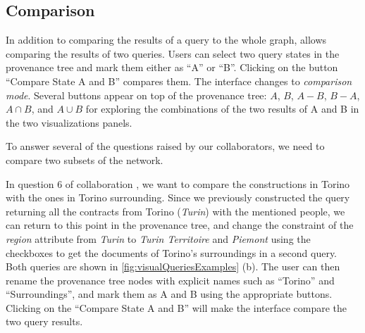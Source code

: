 \subsection{Comparison}

In addition to comparing the results of a query to the whole graph, \name allows comparing the results of two queries.
Users can select two query states in the provenance tree and mark them either as ``A'' or ``B''.
Clicking on the button ``Compare State A and B'' compares them.
The interface changes to \emph{comparison mode}.
Several buttons appear on top of the provenance tree: $A$, $B$, $A-B$, $B-A$, $A \cap B$, and $A \cup B$ for exploring the combinations of the two results of A and B in the two visualizations panels.

To answer several of the questions raised by our collaborators, we need to compare two subsets of the network.

In question 6 of collaboration \pascal, we want to compare the constructions in Torino with the ones in Torino surrounding.
Since we previously constructed the query returning all the contracts from Torino (\textit{Turin}) with the mentioned people, we can
return to this point in the provenance tree, and change the constraint of the \textit{region} attribute from \textit{Turin} to \textit{Turin Territoire} and \textit{Piemont} using the checkboxes to get the documents of Torino's surroundings in a second query.
Both queries are shown in \autoref{fig:visualQueriesExamples} (b).
The user can then rename the provenance tree nodes with explicit names such as ``Torino'' and ``Surroundings'', and mark them as A and B using the appropriate buttons.
Clicking on the ``Compare State A and B'' will make the interface compare the two query results.



